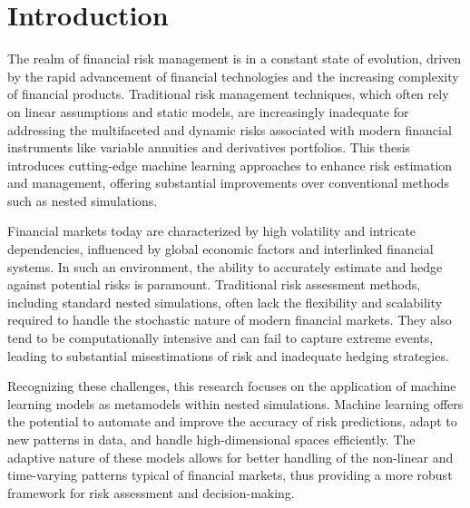 \chapter{Introduction}


The realm of financial risk management is in a constant state of evolution, driven by the rapid advancement of financial technologies and the increasing complexity of financial products. Traditional risk management techniques, which often rely on linear assumptions and static models, are increasingly inadequate for addressing the multifaceted and dynamic risks associated with modern financial instruments like variable annuities and derivatives portfolios. This thesis introduces cutting-edge machine learning approaches to enhance risk estimation and management, offering substantial improvements over conventional methods such as nested simulations.

Financial markets today are characterized by high volatility and intricate dependencies, influenced by global economic factors and interlinked financial systems. In such an environment, the ability to accurately estimate and hedge against potential risks is paramount. Traditional risk assessment methods, including standard nested simulations, often lack the flexibility and scalability required to handle the stochastic nature of modern financial markets. They also tend to be computationally intensive and can fail to capture extreme events, leading to substantial misestimations of risk and inadequate hedging strategies.

Recognizing these challenges, this research focuses on the application of machine learning models as metamodels within nested simulations. Machine learning offers the potential to automate and improve the accuracy of risk predictions, adapt to new patterns in data, and handle high-dimensional spaces efficiently. The adaptive nature of these models allows for better handling of the non-linear and time-varying patterns typical of financial markets, thus providing a more robust framework for risk assessment and decision-making.

